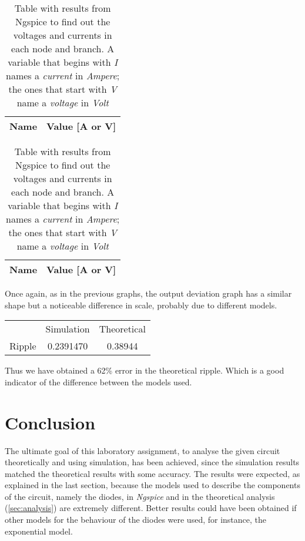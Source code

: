 \begin{table}
    \parbox{.45\linewidth}{
        \centering
        \begin{tabular}{|c|c|}
            \hline
            {\bf Name} & {\bf Value [A or V]} \\ \hline
            
        \end{tabular}
        \label{tab:GainStage_AC}
        \caption{Results of Nodal Analysis of the circuit for t < 0. A variable that begins  with \textit{I} names a \textit{current} in \textit{Ampere}; the ones that start with \textit{V} name a \textit{voltage} in \textit{Volt}}
    }
    \hfill
    \parbox{.45\linewidth}{
        \centering
        \begin{tabular}{|c|c|}
            {\bf Name} & {\bf Value [A or V]} \\ \hline
            
            \hline
        \end{tabular}
        \label{tab:GainStage_OP}
        \caption{Table with results from Ngspice to find out the voltages and currents in each node and branch. A variable that begins  with \textit{I} names a \textit{current} in \textit{Ampere}; the ones that start with \textit{V} name a \textit{voltage} in \textit{Volt} }
    }
\end{table}

Once again, as in the previous graphs, the output deviation graph has a similar shape but a noticeable difference in scale, probably due to different models.


\begin{center}
    \begin{tabular}{ |c|c|c| }
        \hline

               & Simulation & Theoretical \\
        Ripple & 0.2391470  & 0.38944     \\

        \hline
    \end{tabular}
\end{center}

Thus we have obtained a 62\% error in the theoretical ripple. Which is a
good indicator of the difference between the models used.

\section{Conclusion}
\label{sec:conclusion}


The ultimate goal of this laboratory assignment, to analyse
the given circuit theoretically and using simulation, has been achieved, since
the simulation results matched the theoretical results with some accuracy.
The results were expected, as explained in the last section, because
the models used to describe the components of the circuit, namely the diodes,
in \textit{Ngspice} and in the theoretical analysis (\ref{sec:analysis}) are
extremely different. Better results could have been obtained if other
models for the behaviour of the diodes were used, for instance, the
exponential model.

